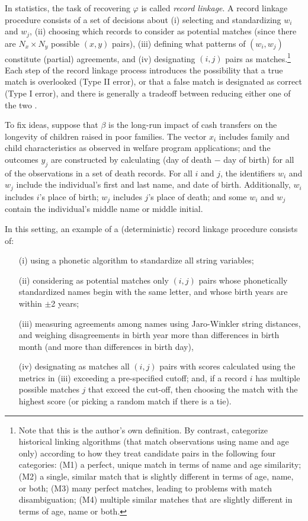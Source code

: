 \documentclass[12pt]{article}
\begin{document}
In statistics, the task of recovering $\varphi$ is called \textit{record linkage}.  A record linkage procedure consists of a set of decisions about (i) selecting and standardizing  $w_i$ and $w_j$, (ii) choosing which records to consider as potential matches (since there are $N_x \times N_y$ possible $(x,y)$ pairs), (iii) defining what patterns of $(w_i,w_j)$ constitute (partial) agreements, and (iv) designating $(i,j)$ pairs as matches.\footnote{Note that this is the author's own definition.  By contrast, \cite{bailey2017} categorize historical linking algorithms (that match observations using name and age only) according to how they treat candidate pairs in the following four categories: (M1) a perfect, unique match in terms of name and age similarity; (M2) a single, similar match that is slightly different in terms of age, name, or both; (M3) many perfect matches, leading to problems with match disambiguation; (M4) multiple similar matches that are slightly different in terms of age, name or both.} Each step of the record linkage process introduces the possibility that a true match is overlooked (Type II error), or that a false match is designated as correct (Type I error), and there is generally a tradeoff between reducing either one of the two \citep{abe2019, harron2018}.

To fix ideas, suppose that $\beta$ is the long-run impact of cash transfers on the longevity of children raised in poor families.  The vector $x_i$ includes family and child characteristics as observed in welfare program applications; and the outcomes $y_j$ are constructed by calculating (day of death $-$ day of birth) for all of the observations in a set of death records.  For all $i$ and $j$, the identifiers $w_i$ and $w_j$ include the individual's first and last name, and date of birth.  Additionally, $w_i$ includes $i$'s place of birth; $w_j$ includes $j$'s place of death; and some $w_i$ and $w_j$ contain the individual's middle name or middle initial. 

In this setting, an example of a (deterministic) record linkage procedure consists of: 
\begin{enumerate}
\item[(i)] using a phonetic algorithm to standardize all string variables; 
\item[(ii)] considering as potential matches only $(i,j)$ pairs whose phonetically standardized names begin with the same letter, and whose birth years are within $\pm$2 years;
\item[(iii)] measuring agreements among names using Jaro-Winkler string distances, and weighing disagreements in birth year more than differences in birth month (and more than differences in birth day), 
\item[(iv)] designating as matches all $(i,j)$ pairs with scores calculated using the metrics in (iii) exceeding a pre-specified cutoff; and, if a record $i$ has multiple possible matches $j$ that exceed the cut-off, then choosing the match with the highest score (or picking a random match if there is a tie).  
\end{enumerate}
\end{document}
